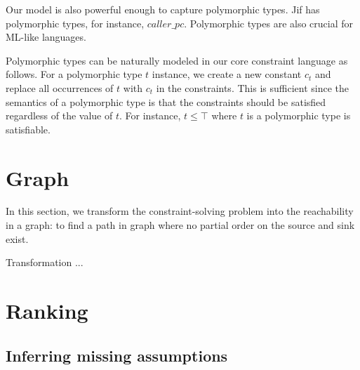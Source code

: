 Our model is also powerful enough to capture polymorphic types.  Jif
has polymorphic types, for instance, $caller\_pc$. Polymorphic types
are also crucial for ML-like languages.

Polymorphic types can be naturally modeled in our core constraint
language as follows. For a polymorphic type $t$ instance, we create a
new constant $c_t$ and replace all occurrences of $t$ with $c_t$ in
the constraints. This is sufficient since the semantics of a
polymorphic type is that the constraints should be satisfied
regardless of the value of $t$. For instance, $t\leq \top$ where $t$
is a polymorphic type is satisfiable.

\section{Graph} 
\label{sec:graph}

In this section, we transform the constraint-solving problem into the
reachability in a graph: to find a path in graph where no partial order on the
source and sink exist. 

Transformation ... 

% 
% 
% 
% 
% 
% 
\section{Ranking}
\label{sec:ranking}

\subsection{Inferring missing assumptions}
\label{sec:assumptions}


